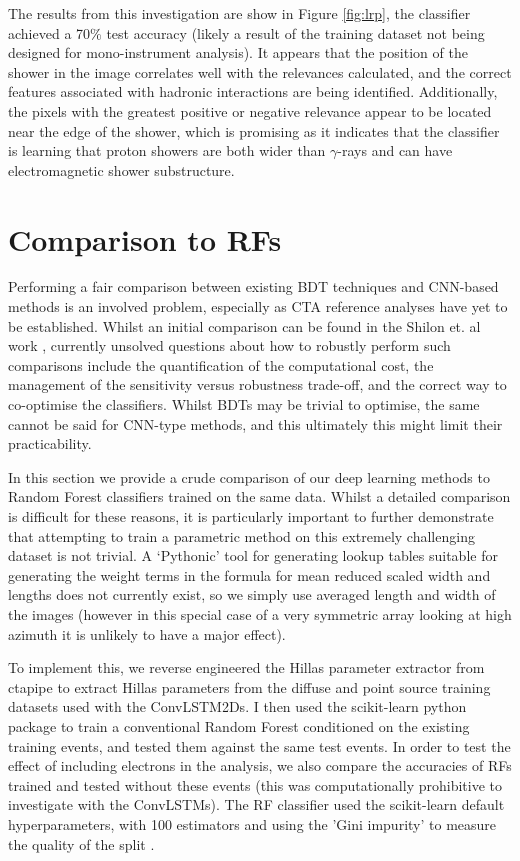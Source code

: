 The results from this investigation are show in Figure \ref{fig:lrp}, the classifier achieved a 70$\%$ test accuracy (likely a result of the training dataset not being designed for mono-instrument analysis). It appears that the position of the shower in the image correlates well with the relevances calculated, and the correct features associated with hadronic interactions are being identified. Additionally, the pixels with the greatest positive or negative relevance appear to be located near the edge of the shower, which is promising as it indicates that the classifier is learning that proton showers are both wider than $\gamma$-rays and can have electromagnetic shower substructure. 

\section{Comparison to RFs}

Performing a fair comparison between existing BDT techniques and CNN-based methods is an involved problem, especially as CTA reference analyses have yet to be established. Whilst an initial comparison can be found in the Shilon et. al work \cite{Shilon}, currently unsolved questions about how to robustly perform such comparisons include the quantification of the computational cost, the management of the sensitivity versus robustness trade-off, and the correct way to co-optimise the classifiers. Whilst BDTs may be trivial to optimise, the same cannot be said for CNN-type methods, and this ultimately this might limit their practicability.

In this section we provide a crude comparison of our deep learning methods to Random Forest classifiers trained on the same data. Whilst a detailed comparison is difficult for these reasons, it is particularly important to further demonstrate that attempting to train a parametric method on this extremely challenging dataset is not trivial. A `Pythonic' tool for generating lookup tables suitable for generating the weight terms in the formula for mean reduced scaled width and lengths does not currently exist, so we simply use averaged length and width of the images (however in this special case of a very symmetric array looking at high azimuth it is unlikely to have a major effect).

To implement this, we reverse engineered the Hillas parameter extractor from ctapipe to extract Hillas parameters from the diffuse and point source training datasets used with the ConvLSTM2Ds. I then used the scikit-learn python package to train a conventional Random Forest conditioned on the existing training events, and tested them against the same test events. In order to test the effect of including electrons in the analysis, we also compare the accuracies of RFs trained and tested without these events (this was computationally prohibitive to investigate with the ConvLSTMs). The RF classifier used the scikit-learn default hyperparameters, with 100 estimators and using the 'Gini impurity' to measure the quality of the split \cite{scikit}.

